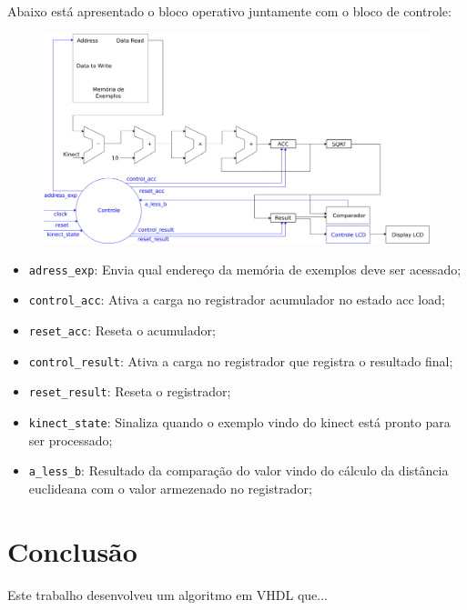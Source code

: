 \documentclass[12pt]{article}
\begin{document}
\newpage

Abaixo está apresentado o bloco operativo juntamente com o bloco de controle:

\begin{figure}[!ht]
\centering
\includegraphics[scale=0.36]{img/circuito_knn.png}
\end{figure}

\begin{itemize}

\item \verb|adress_exp|:  Envia qual endereço da memória de exemplos deve ser acessado;
\item \verb|control_acc|: Ativa a carga no registrador acumulador no estado acc load;
\item \verb|reset_acc|: Reseta o acumulador;
\item \verb|control_result|: Ativa a carga no registrador que registra o resultado final;
\item \verb|reset_result|: Reseta o registrador;
\item \verb|kinect_state|: Sinaliza quando o exemplo vindo do kinect está pronto para ser processado;
\item \verb|a_less_b|: Resultado da comparação do valor vindo do cálculo da distância euclideana com o valor armezenado no registrador;
\end{itemize} 


\section{Conclus\~ao}\label{sec:figs}

Este trabalho desenvolveu um algoritmo em VHDL que...

\end{document}
